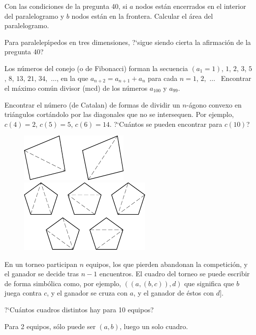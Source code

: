 \documentclass[12pt]{article}  %
\begin{document}
\medskip
{} Con las condiciones de la pregunta 40, si $a$ nodos est\'an encerrados en el interior del paralelogramo y $b$ nodos est\'an en la frontera. Calcular el \'area del paralelogramo. 

\bigskip
{} Para paralelep\'{\i}pedos en tres dimensiones, ?`sigue siendo cierta la afirmaci\'on de la pregunta 40?

\bigskip
{} Los n\'umeros del conejo (o de Fibonacci) forman la secuencia $(a_1=1)$, $1$, $2$, $3$, $5$, $8$, $13$, $21$,
$34$,\nobreak\ $\dots$, en la que $a_{n+2}=a_{n+1}+a_n$ para cada
$n=1$, $2$,\nobreak\ $\dots$ \   Encontrar el m\'aximo com\'un divisor (mcd) de los n\'umeros $a_{100}$ y $a_{99}$.

\newpage

 Encontrar el n\'umero (de Catalan) de formas de dividir un $n$-\'agono convexo en tri\'angulos cort\'andolo por las diagonales que no se intersequen. 
Por ejemplo, $c(4)=2$, $c(5)=5$, $c(6)=14$. ?`Cu\'antos se pueden encontrar para $c(10)$?
\begin{figure}[h]
\centering
\includegraphics[scale=1]{taskbook-281}
\hskip1cm\includegraphics[scale=1]{taskbook-282}
\end{figure}


\bigskip
{} En un torneo participan $n$ equipos, los que pierden abandonan la competici\'on, y el ganador se decide tras $n-1$ encuentros.
El cuadro del torneo se puede escribir de forma simb\'olica como, por ejemplo,  $((a,(b,c)),d)$ que significa que $b$ juega contra $c$, y el ganador se cruza con $a$, y el ganador de \'estos con $d$].

?`Cu\'antos cuadros distintos hay para 10 equipos? 

Para 2 equipos, s\'olo puede ser $(a,b)$, luego un solo cuadro.
\end{document}
